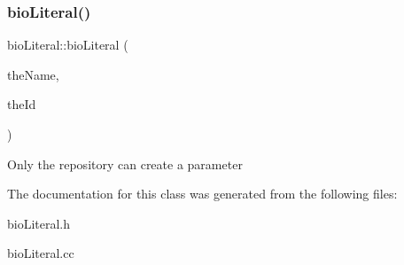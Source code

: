 \subsubsection{\texorpdfstring{bio\+Literal()}{bioLiteral()}}
{\footnotesize\ttfamily bio\+Literal\+::bio\+Literal (\begin{DoxyParamCaption}\item[{pat\+String}]{the\+Name,  }\item[{pat\+U\+Long}]{the\+Id }\end{DoxyParamCaption})\hspace{0.3cm}{\ttfamily [protected]}}

Only the repository can create a parameter 

The documentation for this class was generated from the following files\+:\begin{DoxyCompactItemize}
\item 
bio\+Literal.\+h\item 
bio\+Literal.\+cc\end{DoxyCompactItemize}
